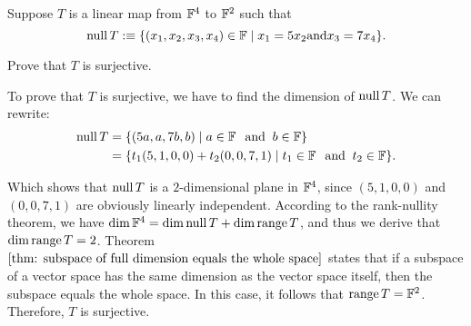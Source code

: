 %
%

\begin{xrcs}
  Suppose $T$ is a linear map from $\mathbb{F}^4$ to $\mathbb{F}^2$ such that
  \begin{equation}
    \operatorname{null} T :\equiv \{(x_1, x_2, x_3, x_4) \in \mathbb{F} \mid x_1 = 5x_2 \text{and} x_3 = 7x_4 \}.
  \end{equation}

  Prove that $T$ is surjective.

  \begin{xprf}
    To prove that $T$ is surjective, we have to find the dimension of $\operatorname{null} T$. We can rewrite:
    \begin{equation}
      \begin{aligned}
        \operatorname{null} T &= \{(5a, a, 7b,b) \mid a \in \mathbb{F} \;\;\, \text{and}\;\; b \in \mathbb{F} \} \\
                  &= \{t_1 (5,1,0,0) + t_2(0,0,7,1) \mid t_1 \in \mathbb{F} \;\;\, \text{and}\;\; t_2 \in \mathbb{F} \}.
      \end{aligned}
    \end{equation}

    Which shows that $\operatorname{null} T$ is a $2$-dimensional plane in $\mathbb{F}^4$, since $(5,1,0,0)$ and $(0,0,7,1)$ are obviously linearly independent. According to the rank-nullity theorem, we have $\dim \mathbb{F}^4 = \dim \operatorname{null} T + \dim \operatorname{range} T$, and thus we derive that $\dim \operatorname{range} T = 2$.
    Theorem $\ref{thm: subspace of full dimension equals the whole space}$ states that if a subspace of a vector space has the same dimension as the vector space itself, then the subspace equals the whole space. In this case, it follows that $\operatorname{range} T = \mathbb{F}^2$. Therefore, $T$ is surjective.
  \end{xprf}
\end{xrcs}

